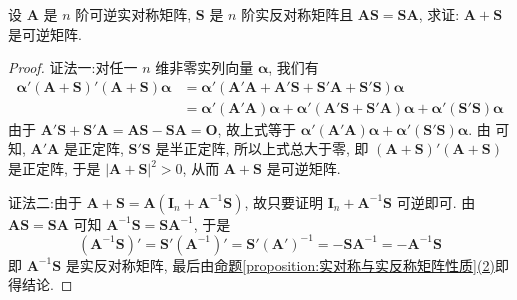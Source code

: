 \documentclass[../../main.tex]{subfiles}%
\begin{document}
\begin{proposition}\label{proposition:可逆实对称与实反称阵可交换则相加也可逆}
设 \(\boldsymbol{A}\) 是 \(n\) 阶可逆实对称矩阵, \(\boldsymbol{S}\) 是 \(n\) 阶实反对称矩阵且 \(\boldsymbol{A}\boldsymbol{S}=\boldsymbol{S}\boldsymbol{A}\), 求证: \(\boldsymbol{A}+\boldsymbol{S}\) 是可逆矩阵.
\end{proposition}
\begin{proof}

{\color{blue}证法一:}对任一 \(n\) 维非零实列向量 \(\boldsymbol{\alpha}\), 我们有
\begin{align*}
\boldsymbol{\alpha}'(\boldsymbol{A}+\boldsymbol{S})'(\boldsymbol{A}+\boldsymbol{S})\boldsymbol{\alpha}&=\boldsymbol{\alpha}'(\boldsymbol{A}'\boldsymbol{A}+\boldsymbol{A}'\boldsymbol{S}+\boldsymbol{S}'\boldsymbol{A}+\boldsymbol{S}'\boldsymbol{S})\boldsymbol{\alpha}\\
&=\boldsymbol{\alpha}'(\boldsymbol{A}'\boldsymbol{A})\boldsymbol{\alpha}+\boldsymbol{\alpha}'(\boldsymbol{A}'\boldsymbol{S}+\boldsymbol{S}'\boldsymbol{A})\boldsymbol{\alpha}+\boldsymbol{\alpha}'(\boldsymbol{S}'\boldsymbol{S})\boldsymbol{\alpha}
\end{align*}
由于 \(\boldsymbol{A}'\boldsymbol{S}+\boldsymbol{S}'\boldsymbol{A}=\boldsymbol{A}\boldsymbol{S}-\boldsymbol{S}\boldsymbol{A}=\boldsymbol{O}\), 故上式等于 \(\boldsymbol{\alpha}'(\boldsymbol{A}'\boldsymbol{A})\boldsymbol{\alpha}+\boldsymbol{\alpha}'(\boldsymbol{S}'\boldsymbol{S})\boldsymbol{\alpha}\). 由 可知, \(\boldsymbol{A}'\boldsymbol{A}\) 是正定阵, \(\boldsymbol{S}'\boldsymbol{S}\) 是半正定阵, 所以上式总大于零, 即 \((\boldsymbol{A}+\boldsymbol{S})'(\boldsymbol{A}+\boldsymbol{S})\) 是正定阵, 于是 \(|\boldsymbol{A}+\boldsymbol{S}|^2>0\), 从而 \(\boldsymbol{A}+\boldsymbol{S}\) 是可逆矩阵.

{\color{blue}证法二:}由于 \(\boldsymbol{A}+\boldsymbol{S}=\boldsymbol{A}(\boldsymbol{I}_n+\boldsymbol{A}^{-1}\boldsymbol{S})\), 故只要证明 \(\boldsymbol{I}_n+\boldsymbol{A}^{-1}\boldsymbol{S}\) 可逆即可. 由 \(\boldsymbol{A}\boldsymbol{S}=\boldsymbol{S}\boldsymbol{A}\) 可知 \(\boldsymbol{A}^{-1}\boldsymbol{S}=\boldsymbol{S}\boldsymbol{A}^{-1}\), 于是
\[
(\boldsymbol{A}^{-1}\boldsymbol{S})'=\boldsymbol{S}'(\boldsymbol{A}^{-1})'=\boldsymbol{S}'(\boldsymbol{A}')^{-1}=-\boldsymbol{S}\boldsymbol{A}^{-1}=-\boldsymbol{A}^{-1}\boldsymbol{S}
\]
即 \(\boldsymbol{A}^{-1}\boldsymbol{S}\) 是实反对称矩阵, 最后由\hyperref[proposition:实对称与实反称矩阵性质]{命题\ref{proposition:实对称与实反称矩阵性质}(2)}即得结论.

\end{proof}
\end{document}
